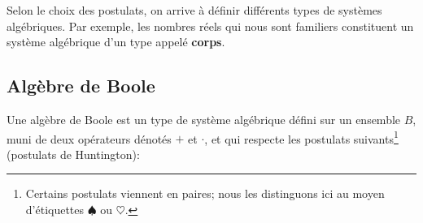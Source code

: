 \documentclass[11pt]{article}
\begin{document}
Selon le choix des postulats, on arrive à définir différents types de
systèmes algébriques. Par exemple, les nombres réels qui nous sont
familiers constituent un système algébrique d'un type appelé \textbf{corps}.

\subsection{Algèbre de Boole}
\label{sec:org6f7fb45}

Une algèbre de Boole est un type de système algébrique défini sur un
ensemble \(B\), muni de deux opérateurs dénotés \(+\) et \(\cdot\), et qui
respecte les postulats suivants\footnote{Certains postulats viennent en paires; nous les distinguons ici au
moyen d'étiquettes \(\spadesuit\) ou \(\heartsuit\).} (postulats de Huntington):
\end{document}
